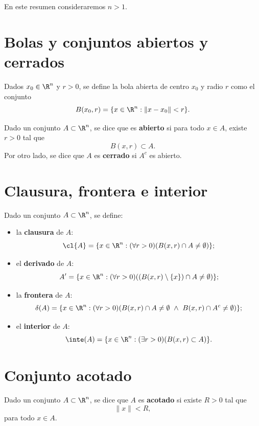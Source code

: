 \documentclass[a4,11pt]{aleph-notas}
\begin{document}
\encabezado

En este resumen consideraremos $n>1$.

\section{Bolas y conjuntos abiertos y cerrados}

\begin{defi}
    Dados $x_0\in\R^n$ y $r>0$, se define la bola abierta de centro $x_0$ y radio $r$ como el conjunto
    \[
        B(x_0,r)=\{x\in\R^n : \|x-x_0\|<r\}.
    \]
\end{defi}

\begin{defi}
    Dado un conjunto $A\subset \R^n$, se dice que es \textbf{abierto} si para todo $x\in A$, existe $r>0$ tal que
    \[
        B(x,r)\subset A.
    \]
    Por otro lado, se dice que $A$ es \textbf{cerrado} si $A^c$ es abierto.
\end{defi}

\section{Clausura, frontera e interior}

\begin{defi}
    Dado un conjunto $A\subset \R^n$, se define:
    \begin{itemize}
        \item la \textbf{clausura} de $A$:
        \[
            \cl{A}=\{x\in \R^n: (\forall r>0)(B(x,r)\cap A\neq \emptyset)\};
        \]
        \item el \textbf{derivado} de $A$:
        \[
            A'=\{x\in \R^n: (\forall r>0)((B(x,r)\setminus\{x\})\cap A\neq \emptyset)\};
        \]
        \item la \textbf{frontera} de $A$:
        \[
            \delta(A)=\{x\in \R^n: (\forall r>0)(B(x,r)\cap A\neq \emptyset\ \land\ B(x,r)\cap A^c\neq \emptyset)\};
        \]
        \item el \textbf{interior} de $A$:
        \[
            \inte(A)=\{x\in \R^n: (\exists r>0)(B(x,r)\subset A)\}.
        \]
    \end{itemize}
\end{defi}

\newpage
\section{Conjunto acotado}

\begin{defi}
    Dado un conjunto $A\subset \R^n$, se dice que $A$ es \textbf{acotado} si existe $R>0$ tal que
    \[
        \|x\|<R,
    \]
    para todo $x\in A$.
\end{defi}
\end{document}

